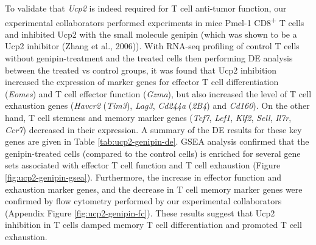 \documentclass[12pt,twoside,openany,\mydriver]{thesis}  %
\begin{document}
To validate that \emph{Ucp2} is indeed required for T cell anti-tumor function, our experimental collaborators performed experiments in mice Pmel-1 CD8\textsuperscript{+} T cells and inhibited Ucp2 with the small molecule genipin (which was shown to be a Ucp2 inhibitor (Zhang et al., 2006)). With RNA-seq profiling of control T cells without genipin-treatment and the treated cells then performing DE analysis between the treated vs control groups, it was found that Ucp2 inhibition increased the expression of marker genes for effector T cell differentiation (\emph{Eomes}) and T cell effector function (\emph{Gzma}), but also increased the level of T cell exhaustion genes (\emph{Havcr2} (\emph{Tim3}), \emph{Lag3}, \emph{Cd244a} (\emph{2B4}) and \emph{Cd160}). On the other hand, T cell stemness and memory marker genes (\emph{Tcf7}, \emph{Lef1}, \emph{Klf2}, \emph{Sell}, \emph{Il7r}, \emph{Ccr7}) decreased in their expression. A summary of the DE results for these key genes are given in Table \ref{tab:ucp2-genipin-de}. GSEA analysis confirmed that the genipin-treated cells (compared to the control cells) is enriched for several gene sets associated with effector T cell function and T cell exhaustion (Figure \ref{fig:ucp2-genipin-gsea}). Furthermore, the increase in effector function and exhaustion marker genes, and the decrease in T cell memory marker genes were confirmed by flow cytometry performed by our experimental collaborators (Appendix Figure \ref{fig:ucp2-genipin-fc}). These results suggest that Ucp2 inhibition in T cells damped memory T cell differentiation and promoted T cell exhaustion.
\end{document}
